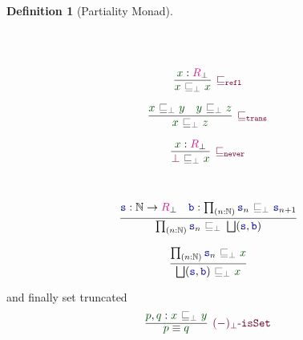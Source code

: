 \documentclass[twoside,11pt,openright]{report}
\theoremstyle{plain} %
\theoremstyle{definition}
\newtheorem{defn}[thm]{Definition}%
\theoremstyle{remark}
\newcommand*{\term}[1]{\textcolor{green!30!black}{#1}} %
\newcommand*{\type}[1]{\textcolor{magenta!90!black}{#1}}
\newcommand*{\relation}[1]{\textcolor{gray!75!black}{\ensuremath{\mathtt{#1}}}}
\newcommand*{\function}[1]{\textcolor{blue!60!black}{\ensuremath{\mathtt{#1}}}}
\newcommand*{\constructor}[1]{\textcolor{purple!60!black}{\ensuremath{\mathtt{#1}}}}
\begin{document}
\begin{defn}[Partiality Monad]
\begin{center}
\begin{minipage}{0.45\linewidth}
\begin{equation}
      \end{equation}
    \end{minipage}
  \end{center}
  \strut\\[-15mm]
  \begin{center}
    \begin{minipage}{0.25\linewidth}
      \begin{equation}
        \vcenter{\infer[\constructor{\sqsubseteq_{refl}}]{\term{x}~\relation{\sqsubseteq_{\bot}}~\term{x}}{\term{x} : \type{R}_\bot}}
      \end{equation}
    \end{minipage}
    \hfill
    \begin{minipage}{0.35\linewidth}
      \begin{equation}
        \vcenter{\infer[\constructor{\sqsubseteq_{trans}}]{\term{x}~\relation{\sqsubseteq_{\bot}}~\term{z}}{\term{x}~\relation{\sqsubseteq_{\bot}}~\term{y} & \term{y}~\relation{\sqsubseteq_{\bot}}~\term{z}}}
      \end{equation}
    \end{minipage}
    \hfill
    \begin{minipage}{0.25\linewidth}
      \begin{equation}
        \vcenter{\infer[\constructor{\sqsubseteq_{never}}]{\constructor{\bot}~\relation{\sqsubseteq_{\bot}}~\term{x}}{\term{x} : \type{R}_\bot}}
      \end{equation}
    \end{minipage}
  \end{center}
  \strut\\[-15mm]
  \begin{center}
    \hfill
    \begin{minipage}{0.50\linewidth}
      \begin{equation}
        \vcenter{\infer{\prod_{(n : \mathbb{N})} \function{s}_n~\relation{\sqsubseteq_{\bot}}~\bigsqcup(\function{s},\function{b})}{\function{s} : \mathbb{N} \rightarrow \type{R}_\bot & \function{b} : \prod_{(n : \mathbb{N})} \function{s}_n~\relation{\sqsubseteq_{\bot}}~\function{s}_{n+1} }}
      \end{equation}
    \end{minipage}
    \hfill
    \begin{minipage}{0.3\linewidth}
      \begin{equation}
        \vcenter{\infer{\bigsqcup(\function{s},\function{b})~\relation{\sqsubseteq_{\bot}}~\term{x}}{\prod_{(n:\mathbb{N})} \function{s}_n~\relation{\sqsubseteq_{\bot}}~\term{x}}}
      \end{equation}
    \end{minipage}
  \end{center}
  and finally set truncated
  \begin{equation}
    \vcenter{\infer[\constructor{(-)_\bot\text{-}isSet}]{\term{p} \equiv \term{q}}{\term{p} , \term{q} : \term{x}~\relation{\sqsubseteq_{\bot}}~\term{y}}}
  \end{equation}
\end{defn}
\end{document}
